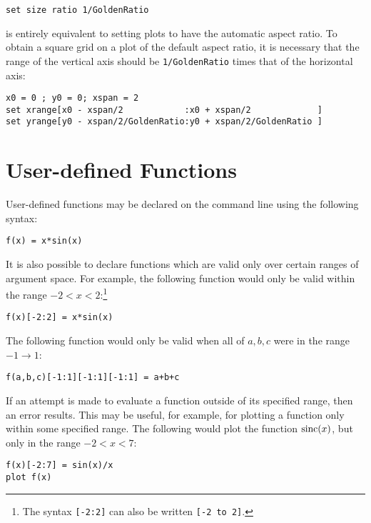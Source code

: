 \begin{verbatim}
set size ratio 1/GoldenRatio
\end{verbatim}

\noindent is entirely equivalent to setting plots to have the automatic aspect
ratio. To obtain a square grid on a plot of the default aspect ratio, it is
necessary that the range of the vertical axis should be {\tt 1/GoldenRatio}
times that of the horizontal axis:

\begin{verbatim}
x0 = 0 ; y0 = 0; xspan = 2
set xrange[x0 - xspan/2            :x0 + xspan/2             ]
set yrange[y0 - xspan/2/GoldenRatio:y0 + xspan/2/GoldenRatio ]
\end{verbatim}

\section{User-defined Functions}

User-defined functions may be declared on the command line using the following
syntax:

\begin{verbatim}
f(x) = x*sin(x)
\end{verbatim}

\noindent It is also possible to declare functions which are valid only over
certain ranges of argument space. For example, the following function would
only be valid within the range $-2<x<2$:\footnote{The syntax {\tt [-2:2]} can
also be written {\tt [-2 to 2]}.}

\begin{verbatim}
f(x)[-2:2] = x*sin(x)
\end{verbatim}

\noindent The following function would only be valid when all of ${a,b,c}$ were
in the range $-1 \to 1$:

\begin{verbatim}
f(a,b,c)[-1:1][-1:1][-1:1] = a+b+c
\end{verbatim}

If an attempt is made to evaluate a function outside of its specified range,
then an error results. This may be useful, for example, for plotting a function
only within some specified range. The following would plot the function
${\rm sinc}(x)$, but only in the range $-2<x<7$:

\begin{verbatim}
f(x)[-2:7] = sin(x)/x
plot f(x)
\end{verbatim}

